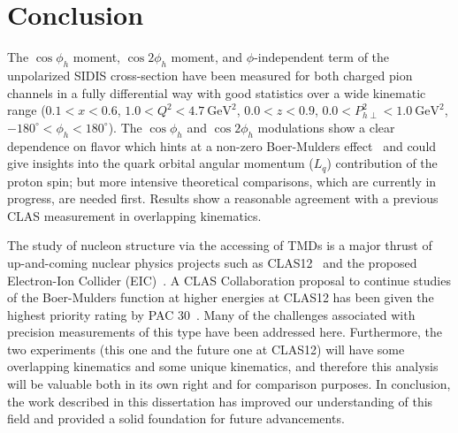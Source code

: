 \chapter{Conclusion}
\label{cha:Conclusion}

The $\cos\phi_h$ moment, $\cos 2\phi_h$ moment, and $\phi$-independent term of the unpolarized SIDIS cross-section have been measured for both charged pion channels in a fully differential way with good statistics over a wide kinematic range ($0.1 < x < 0.6$, $1.0 < Q^2 < 4.7\ \text{GeV}^2$, $0.0 < z < 0.9$, $0.0 < P_{h\perp}^2 < 1.0\ \text{GeV}^2$, $-180^\circ < \phi_h < 180^\circ$).
The $\cos\phi_h$ and $\cos 2\phi_h$ modulations show a clear dependence on flavor which hints at a non-zero Boer-Mulders effect~\cite{Gamberg08}\cite{Barone08}\cite{Zhang08}\cite{Barone10} and could give insights into the quark orbital angular momentum ($L_q$) contribution of the proton spin; but more intensive theoretical comparisons, which are currently in progress, are needed first.
Results show a reasonable agreement with a previous CLAS measurement in overlapping kinematics.

The study of nucleon structure via the accessing of TMDs is a major thrust of up-and-coming nuclear physics projects such as CLAS12~\cite{Burkert08} and the proposed Electron-Ion Collider (EIC)~\cite{Boer11}.
A CLAS Collaboration proposal to continue studies of the Boer-Mulders function at higher energies at CLAS12 has been given the highest priority rating by PAC 30~\cite{Avakian06}.
Many of the challenges associated with precision measurements of this type have been addressed here.
Furthermore, the two experiments (this one and the future one at CLAS12) will have some overlapping kinematics and some unique kinematics, and therefore this analysis will be valuable both in its own right and for comparison purposes.
In conclusion, the work described in this dissertation has improved our understanding of this field and provided a solid foundation for future advancements.

